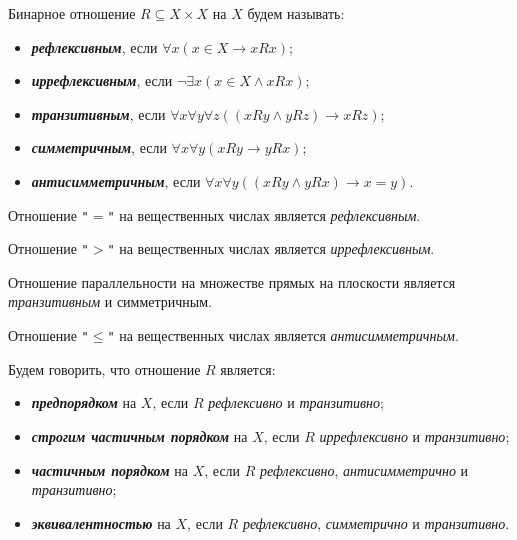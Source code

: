 \documentclass{article}
\begin{document}
    \begin{definition_boxed}
        Бинарное отношение $R \subseteq X \times X$ на $X$ будем называть:
        \begin{itemize}

            \item \textbf{\textit{рефлексивным}}, если $\forall x(x \in X \rightarrow xRx)$;
            \item \textbf{\textit{иррефлексивным}}, если $\neg\exists x(x \in X \wedge xRx)$;
            \item \textbf{\textit{транзитивным}}, если $\forall x\forall y\forall z((xRy \wedge yRz) \rightarrow xRz)$;
            \item \textbf{\textit{симметричным}}, если $\forall x\forall y(xRy \rightarrow yRx)$;
            \item \textbf{\textit{антисимметричным}}, если $\forall x\forall y((xRy \wedge yRx) \rightarrow x = y)$.
        \end{itemize}
    \end{definition_boxed}

    \begin{example}
        Отношение \texttt{"$=$"} на вещественных числах является \textit{рефлексивным}.
    \end{example}

    \begin{example}
        Отношение \texttt{"$>$"} на вещественных числах является \textit{иррефлексивным}.
    \end{example}

    \begin{example}
        Отношение параллельности на множестве прямых на плоскости является \textit{транзитивным} и симметричным.
    \end{example}

    \begin{example}
        Отношение \texttt{"$\leqslant$"} на вещественных числах является \textit{антисимметричным}.
    \end{example}

    \begin{definition_boxed}
        Будем говорить, что отношение $R$ является:
        \begin{itemize}
            \item \textbf{\textit{предпорядком}} на $X$, если $R$ \textit{рефлексивно} и \textit{транзитивно};
            \item \textbf{\textit{строгим частичным порядком}} на $X$, если $R$ \textit{иррефлексивно} и \textit{транзитивно};
            \item \textbf{\textit{частичным порядком}} на $X$, если $R$ \textit{рефлексивно}, \textit{антисимметрично} и \textit{транзитивно};
            \item \textbf{\textit{эквивалентностью}} на $X$, если $R$ \textit{рефлексивно}, \textit{симметрично} и \textit{транзитивно}.
        \end{itemize}

    \end{definition_boxed}
\end{document}

